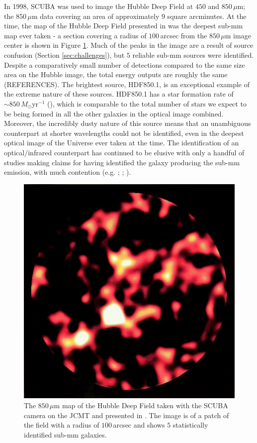 In 1998, SCUBA was used to image the Hubble Deep Field at $450$ and $850\,\mu$m; the $850\,\mu$m data covering an area of approximately $9$ square arcminutes. At the time, the map of the Hubble Deep Field presented in \citealt{Hughes_1998} was the deepest sub-mm map ever taken - a section covering a radius of $100\,$arcsec from the $850\,\mu$m image center is shown in Figure \ref{fig:hubble_deep_field_scuba}. Much of the peaks in the image are a result of source confusion (Section \ref{sec:challenges}), but $5$ reliable sub-mm sources were identified. Despite a comparatively small number of detections compared to the same size area on the Hubble image, the total energy outputs are roughly the same ({\color{red}REFERENCES}). The brightest source, HDF850.1, is an exceptional example of the extreme nature of these sources. HDF850.1 has a star formation rate of $\sim 850\,M_\odot$yr$^{-1}$ (\citealt{Walter_2012}), which is comparable to the total number of stars we expect to be being formed in all the other galaxies in the optical image combined. Moreover, the incredibly dusty nature of this source means that an unambiguous counterpart at shorter wavelengths could not be identified, even in the deepest optical image of the Universe ever taken at the time. The identification of an optical/infrared counterpart has continued to be elusive with only a handful of studies making claims for having identified the galaxy producing the sub-mm emission, with much contention (e.g. \citealt{Dunlop_2004}; \citealt{Serjeant_2014}; \citealt{Sun_2023}).

\begin{figure}
    \centering
	\includegraphics[width=0.75\columnwidth]{Figures/hubble_deep_field_scuba.pdf}
	\caption{The $850\,\mu$m map of the Hubble Deep Field taken with the SCUBA camera on the JCMT and presented in \citealt{Hughes_1998}. The image is of a patch of the field with a radius of $100\,$arcsec and shows $5$ statistically identified sub-mm galaxies.}
	\label{fig:hubble_deep_field_scuba}
\end{figure}

